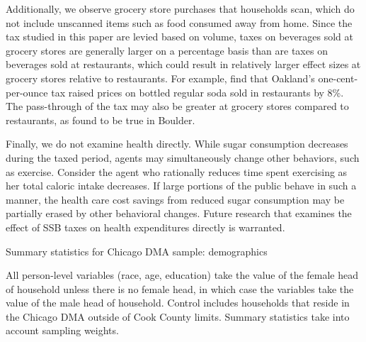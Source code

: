 \documentclass[12pt]{article}
\begin{document}
Additionally, we observe grocery store purchases that households scan, which do not include unscanned items such as food consumed away from home. Since the tax studied in this paper are levied based on volume, taxes on beverages sold at grocery stores are generally larger on a percentage basis than are taxes on beverages sold at restaurants, which could result in relatively larger effect sizes at grocery stores relative to restaurants. For example, \textcite{marinello2020impact} find that Oakland's one-cent-per-ounce tax raised prices on bottled regular soda sold in restaurants by 8\%. The pass-through of the tax may also be greater at grocery stores compared to restaurants, as \textcite{cawley2021boulder} found to be true in Boulder.

Finally, we do not examine health directly. While sugar consumption decreases during the taxed period, agents may simultaneously change other behaviors, such as exercise. Consider the agent who rationally reduces time spent exercising as her total caloric intake decreases. If large portions of the public behave in such a manner, the health care cost savings from reduced sugar consumption may be partially erased by other behavioral changes. Future research that examines the effect of SSB taxes on health expenditures directly is warranted.


\clearpage
\printbibliography


\singlespacing
\clearpage
\begin{table}
\caption{Summary statistics for Chicago DMA sample: demographics}
\label{summary_table}

\footnotesize{All person-level variables (race, age, education) take the value of the female head of household unless there is no female head, in which case the variables take the value of the male head of household. Control includes households that reside in the Chicago DMA outside of Cook County limits. Summary statistics take into account sampling weights.}
\end{table}


\clearpage


\clearpage


\clearpage


\clearpage

\end{document}
